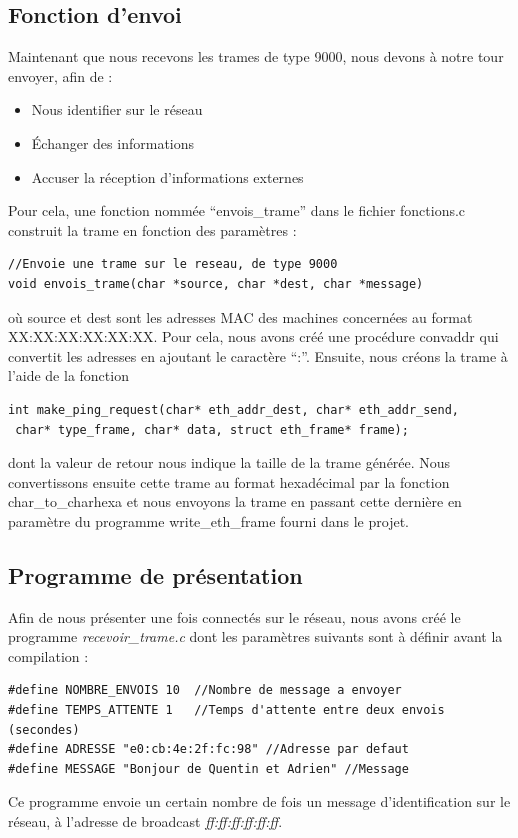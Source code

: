 \documentclass[a4paper,11pt]{article}
\begin{document}
	\subsection{Fonction d'envoi}
	Maintenant que nous recevons les trames de type 9000, nous devons à notre tour envoyer, afin de :
	\begin{itemize}
	\item Nous identifier sur le réseau
	\item Échanger des informations
	\item Accuser la réception d'informations externes
	\end{itemize}
	Pour cela, une fonction nommée ``envois\_trame'' dans le fichier fonctions.c construit la trame en fonction des paramètres :
	\lstset{language=C}
\begin{lstlisting}
//Envoie une trame sur le reseau, de type 9000
void envois_trame(char *source, char *dest, char *message)
\end{lstlisting}
	où source et dest sont les adresses MAC des machines concernées au format XX:XX:XX:XX:XX:XX. Pour cela, nous avons créé une procédure convaddr qui convertit les adresses en ajoutant le caractère \enquote{:}. Ensuite, nous créons la trame à l'aide de la fonction
	\lstset{language=C}
\begin{lstlisting}
int make_ping_request(char* eth_addr_dest, char* eth_addr_send,
 char* type_frame, char* data, struct eth_frame* frame);
\end{lstlisting}
	dont la valeur de retour nous indique la taille de la trame générée. Nous convertissons ensuite cette trame au format hexadécimal par la fonction char\_to\_charhexa et nous envoyons la trame en passant cette dernière en paramètre du programme write\_eth\_frame fourni dans le projet.
	\subsection{Programme de présentation}
	Afin de nous présenter une fois connectés sur le réseau, nous avons créé le programme \textit{recevoir\_trame.c} dont les paramètres suivants sont à définir avant la compilation :
	\lstset{language=C}
\begin{lstlisting}
#define NOMBRE_ENVOIS 10  //Nombre de message a envoyer
#define TEMPS_ATTENTE 1	  //Temps d'attente entre deux envois (secondes)
#define ADRESSE "e0:cb:4e:2f:fc:98" //Adresse par defaut
#define MESSAGE "Bonjour de Quentin et Adrien" //Message
\end{lstlisting}
	Ce programme envoie un certain nombre de fois un message d'identification sur le réseau, à l'adresse de broadcast \textit{ff:ff:ff:ff:ff:ff}.
\end{document}
